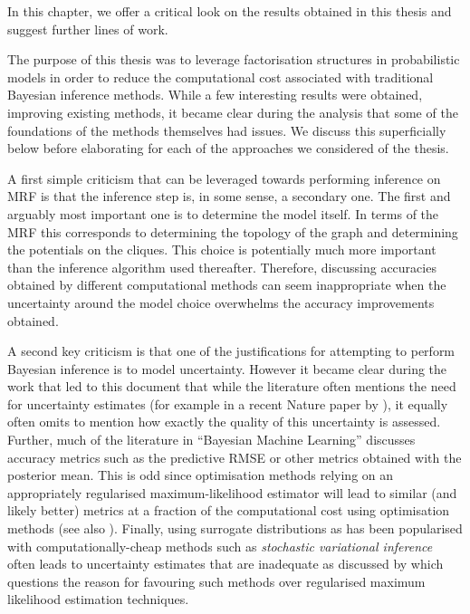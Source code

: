 
In this chapter, we offer a critical look on the results obtained in this thesis and suggest further lines of work.

The purpose of this thesis was to leverage factorisation structures in probabilistic models in order to reduce the computational cost associated with traditional Bayesian inference methods. While a few interesting results were obtained, improving existing methods, it became clear during the analysis that some of the foundations of the methods themselves had issues. We discuss this superficially below before elaborating for each of the approaches we considered of the thesis. 

A first simple criticism that can be leveraged towards performing inference on MRF is that the inference step is, in some sense, a secondary one. The first and arguably most important one is to determine the model itself. In terms of the MRF this corresponds to determining the topology of the graph and determining the potentials on the cliques. This choice is potentially much more important than the inference algorithm used thereafter. Therefore, discussing accuracies obtained by different computational methods can seem inappropriate when the uncertainty around the model choice overwhelms the accuracy improvements obtained. 

A second key criticism is that one of the justifications for attempting to perform Bayesian inference is to model uncertainty. However it became clear during the work that led to this document that while the literature often mentions the need for uncertainty estimates (for example in a recent Nature paper by \citet{ghahramani15}), it equally often omits to mention how exactly the quality of this uncertainty is assessed. Further, much of the literature in ``Bayesian Machine Learning'' discusses accuracy metrics such as the predictive RMSE or other metrics obtained with the posterior mean. This is odd since optimisation methods relying on an appropriately regularised maximum-likelihood estimator will lead to similar (and likely better) metrics at a fraction of the computational cost using optimisation methods (see also \citet{green15}). %
Finally, using surrogate distributions as has been popularised with computationally-cheap methods such as \emph{stochastic variational inference} \citep{hoffman13} often leads to uncertainty estimates that are inadequate as discussed by \cite{wang05} which questions the reason for favouring such methods over regularised maximum likelihood estimation techniques.

